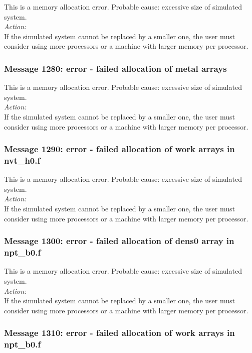 This is a memory allocation error. Probable cause: excessive size of
simulated system. \\

\noindent
{\em Action:}\\
If the simulated system cannot be replaced by a smaller one, the user
must consider using more processors or a machine with larger memory
per processor.

\subsubsection*{Message 1280: error - failed allocation of metal
arrays}

This is a memory allocation error. Probable cause: excessive size of
simulated system. \\

\noindent
{\em Action:}\\
If the simulated system cannot be replaced by a smaller one, the user
must consider using more processors or a machine with larger memory
per processor.

\subsubsection*{Message 1290: error - failed allocation of work arrays
in nvt\_h0.f}

This is a memory allocation error. Probable cause: excessive size of
simulated system. \\

\noindent
{\em Action:}\\
If the simulated system cannot be replaced by a smaller one, the user
must consider using more processors or a machine with larger memory
per processor.

\subsubsection*{Message 1300: error - failed allocation of dens0 array
in npt\_b0.f}

This is a memory allocation error. Probable cause: excessive size of
simulated system. \\

\noindent
{\em Action:}\\
If the simulated system cannot be replaced by a smaller one, the user
must consider using more processors or a machine with larger memory
per processor.

\subsubsection*{Message 1310: error - failed allocation of work arrays
in npt\_b0.f}

